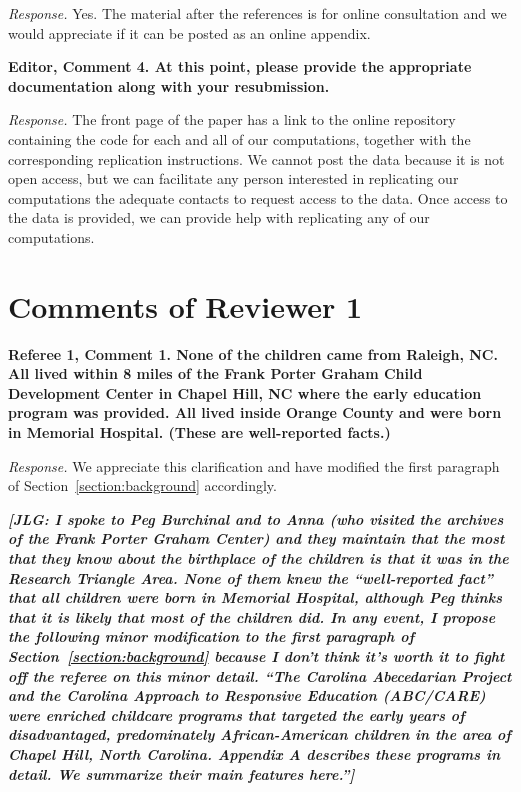 \noindent \textit{Response.} Yes. The material after the references is for online consultation and we would appreciate if it can be posted as an online appendix.

\noindent \textbf{Editor, Comment 4. At this point, please provide the appropriate documentation along with your resubmission.}

\noindent \textit{Response.} The front page of the paper has a link to the online repository containing the code for each and all of our computations, together with the corresponding replication instructions. We cannot post the data because it is not open access, but we can facilitate any person interested in replicating our computations the adequate contacts to request access to the data. Once access to the data is provided, we can provide help with replicating any of our computations.

\section*{Comments of Reviewer 1}

\noindent \textbf{Referee 1, Comment 1. None of the children came from Raleigh, NC. All lived within 8 miles of the Frank Porter Graham Child Development Center in Chapel Hill, NC where the early education program was provided. All lived inside Orange County and were born in Memorial Hospital. (These are well-reported facts.)}

\noindent \textit{Response.} We appreciate this clarification and have modified the first paragraph of Section~\ref{section:background} accordingly.

\textit{\textbf{[JLG: I spoke to Peg Burchinal and to Anna (who visited the archives of the Frank Porter Graham Center) and they maintain that the most that they know about the birthplace of the children is that it was in the Research Triangle Area. None of them knew the ``well-reported fact'' that all children were born in Memorial Hospital, although Peg thinks that it is likely that most of the children did. In any event, I propose the following minor modification to the first paragraph of Section~\ref{section:background} because I don't think it's worth it to fight off the referee on this minor detail. ``The Carolina Abecedarian Project and the Carolina Approach to Responsive Education (ABC/CARE) were enriched childcare programs that targeted the early years of disadvantaged, predominately African-American children in the area of Chapel Hill, North Carolina. Appendix A describes these programs in detail. We summarize their main features here.'']}}

